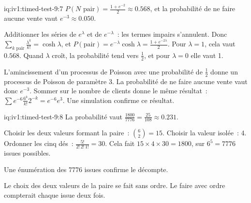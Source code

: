 \begin{solution}{iq:iv1:timed-test-9:7}
$P(N \text{ pair}) = \frac{1 + e^{-2}}{2} \approx 0.568$, et la probabilité de ne faire aucune vente vaut $e^{-3} \approx 0.050$.

Additionner les séries de $e^{\lambda}$ et de $e^{-\lambda}$~: les termes impairs s'annulent. Donc $\sum_{k \text{ pair}}\frac{\lambda^k}{k!} = \cosh\lambda$, et $P(\text{pair}) = e^{-\lambda}\cosh\lambda = \frac{1 + e^{-2\lambda}}{2}$. Pour $\lambda = 1$, cela vaut $0.568$. Quand $\lambda$ croît, la probabilité tend vers $\frac12$, et pour $\lambda = 0$ elle vaut 1.

L'amincissement d'un processus de Poisson avec une probabilité de $\frac12$ donne un processus de Poisson de paramètre 3. La probabilité de ne faire aucune vente vaut donc $e^{-3}$. Sommer sur le nombre de clients donne le même résultat~: $\sum e^{-6}\frac{6^k}{k!}2^{-k} = e^{-6}e^{3}$. Une simulation confirme ce résultat.

\end{solution}

\begin{solution}{iq:iv1:timed-test-9:8}
La probabilité vaut $\frac{1800}{7776} = \frac{25}{108} \approx 0.231$.

Choisir les deux valeurs formant la paire~: $\binom62 = 15$. Choisir la valeur isolée~: 4. Ordonner les cinq dés~: $\frac{5!}{2!\,2!\,1!} = 30$. Cela fait $15 \times 4 \times 30 = 1800$, sur $6^5 = 7776$ issues possibles.

Une énumération des 7776 issues confirme le décompte.

Le choix des deux valeurs de la paire se fait sans ordre. Le faire avec ordre compterait chaque issue deux fois.


\end{solution}

